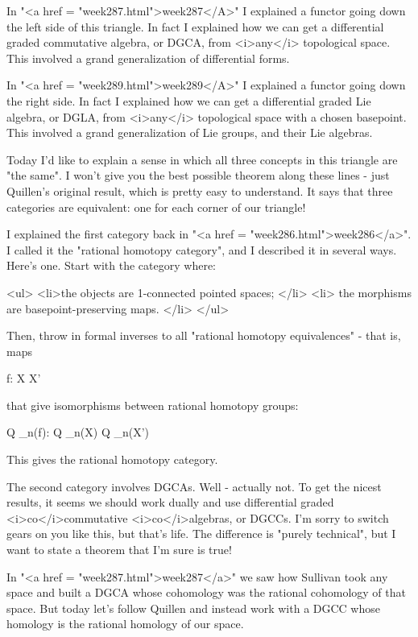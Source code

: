 In "<a href = "week287.html">week287</A>" I explained a
functor going down the left side of this triangle.  In fact I
explained how we can get a differential graded commutative algebra, or
DGCA, from <i>any</i> topological space.  This involved a grand
generalization of differential forms.

In "<a href = "week289.html">week289</A>" I explained a
functor going down the right side.  In fact I explained how we can get
a differential graded Lie algebra, or DGLA, from <i>any</i>
topological space with a chosen basepoint.  This involved a grand
generalization of Lie groups, and their Lie algebras.

Today I'd like to explain a sense in which all three concepts in this
triangle are "the same".  I won't give you the best possible
theorem along these lines - just Quillen's original result, which is
pretty easy to understand.  It says that three categories are
equivalent: one for each corner of our triangle!

I explained the first category back in "<a href =
"week286.html">week286</a>".  I called it the "rational
homotopy category", and I described it in several ways.  Here's
one.  Start with the category where:

<ul>
<li>the
objects are 1-connected pointed spaces;
</li>
<li>
the morphisms are basepoint-preserving maps.
</li>
</ul>

Then, throw in formal inverses to all "rational homotopy
equivalences" - that is, maps

f: X \to  X'

that give isomorphisms between rational homotopy groups:

Q \otimes  \pi _{n}(f): Q \otimes  \pi _{n}(X) 
\to  Q \otimes  \pi _{n}(X')

This gives the rational homotopy category.

The second category involves DGCAs.  Well - actually not.  To get the
nicest results, it seems we should work dually and use differential
graded <i>co</i>commutative <i>co</i>algebras, or DGCCs.  I'm sorry to
switch gears on you like this, but that's life.  The difference is
"purely technical", but I want to state a theorem that I'm
sure is true!

In "<a href = "week287.html">week287</a>" we saw how
Sullivan took any space and built a DGCA whose cohomology was the
rational cohomology of that space.  But today let's follow
Quillen and instead work with a DGCC whose homology is the rational
homology of our space.  

